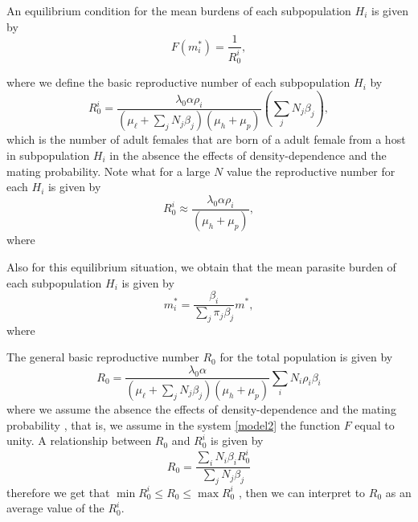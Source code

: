 \documentclass[eng]{MMSB-class-eng}
\begin{document}
An equilibrium condition for the mean burdens of each subpopulation $H_{i}$ is given by
\begin{equation}%
F(m^*_{i})=\dfrac{1}{R_0^{i}},
\end{equation}
{\color{red}
where we define the basic reproductive number of each subpopulation $H_i$ by
\begin{equation}%
R_0^{i}=\frac{ \lambda_0 \alpha \rho_{i}}{ (\mu_{\ell}+\sum_j N_j \beta_j )(\mu_{h}+\mu_p)} \left( \sum_j N_j\beta_{j} \right),
\end{equation}
which is the number of adult females that are born of a adult female from a host in subpopulation $H_i$ in the absence the effects of density-dependence and the mating probability. Note what for a large $N$ value the reproductive number for each $H_i$ is given by
%
%
\begin{equation}
R_0^i\approx \frac{ \lambda_0 \alpha  \rho_i }{ (\mu_h + \mu_p) },  
\end{equation}
where

Also for this equilibrium situation, we obtain that the mean parasite burden of each subpopulation $H_{i}$ is given by
\begin{equation}
m_{i}^*=\frac{\beta_{i}}{ \sum_j \pi_j\beta_{j } }m^*,
\end{equation}
where
}

The general basic reproductive number $R_0$ for the total population is given by %
\begin{equation}\label{valorR0}
R_{0}=\frac{\lambda_0 \alpha }
{ (\mu_{\ell}+\sum_j N_j \beta_j  )(\mu_{h}+\mu_p)}
\sum_i N_i \rho_{i} \beta_{i}   
\end{equation}
where we assume the absence the effects of density-dependence and the mating probability \citep{anderson1992infectious}, that is, we assume in the system \eqref{model2} the function $F$ equal to unity.
A relationship between $R_0$ and $R_0^i$ is given by
\begin{equation}
R_{0}=\frac{\sum_i N_i\beta_{i}R_0^i}
{\sum_j N_j \beta_{j}}   
\end{equation}
therefore we get that $\min R_0^i\leq R_0 \leq \max R_0^i$
, then we can interpret to $R_0$ as an average value of the $R_0^i$.
\end{document}
